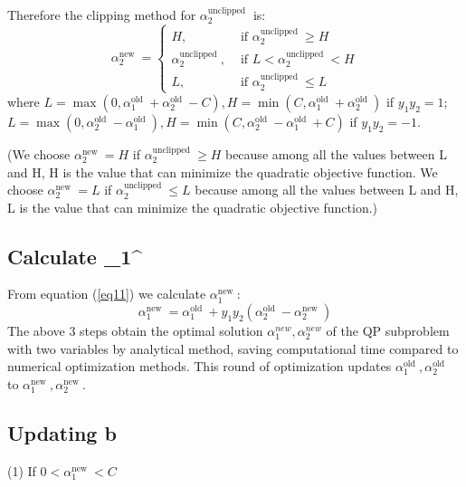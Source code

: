 \documentclass{article}
\begin{document}
Therefore the clipping method for $\alpha_2^{\text {unclipped }}$ is:
$$
\alpha_2^{\text {new }}=\left\{\begin{aligned}
H, & \text { if } \alpha_2^{\text {unclipped }} \geq H \\
\alpha_2^{\text {unclipped }}, & \text { if } L<\alpha_2^{\text {unclipped }}<H \\
L, & \text { if } \alpha_2^{\text {unclipped }} \leq L
\end{aligned}\right.
$$
where $L=\max \left(0, \alpha_1^{\text {old }}+\alpha_2^{\text {old }}-C\right), H=\min \left(C, \alpha_1^{\text {old }}+\alpha_2^{\text {old }}\right)$ if $y_1 y_2=1$; $L=\max \left(0, \alpha_2^{\text {old }}-\alpha_1^{\text {old }}\right), H=\min \left(C, \alpha_2^{\text {old }}-\alpha_1^{\text {old }}+C\right)$ if $y_1 y_2=-1$.

(We choose $\alpha_2^{\text {new }}=H$ if $\alpha_2^{\text {unclipped }} \geq H$ because among all the values between L and H, H is the value that can minimize the quadratic objective function. We choose $\alpha_2^{\text {new }}=L$ if $\alpha_2^{\text {unclipped }} \leq L$ because among all the values between L and H, L is the value that can minimize the quadratic objective function.)


\subsection{Calculate \alpha_1^{}}

From equation (\ref{eq11}) we calculate $\alpha_1^{\text {new }}$:
$$
\alpha_1^{\text {new }}=\alpha_1^{\text {old }}+y_1 y_2\left(\alpha_2^{\text {old }}-\alpha_2^{\text {new }}\right)
$$
The above 3 steps obtain the optimal solution $\alpha_1^{n e w}, \alpha_2^{n e w}$ of the QP subproblem with two variables by analytical method, saving computational time compared to numerical optimization methods. This round of optimization updates $\alpha_1^{\text {old }}, \alpha_2^{\text {old }}$ to $\alpha_1^{\text {new }}, \alpha_2^{\text {new }}$.

\subsection{Updating b}

(1) If $0 < \alpha_1^{\text {new }} < C$
\end{document}
